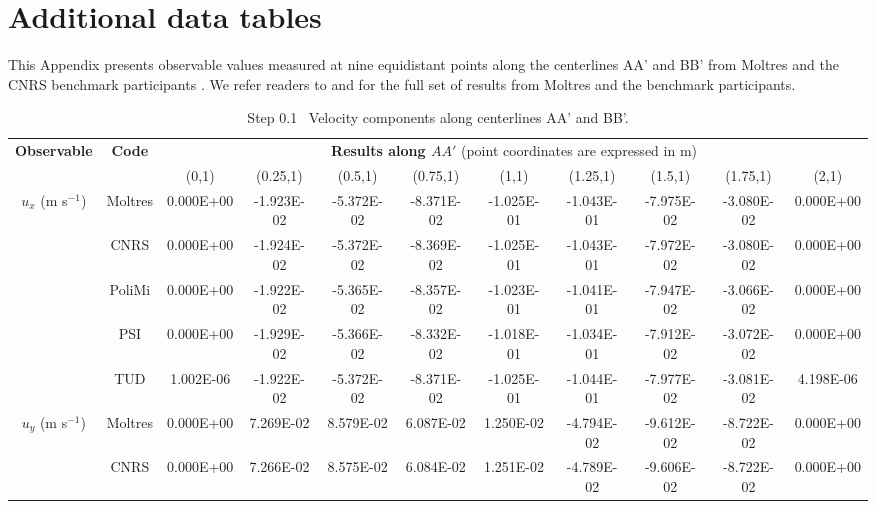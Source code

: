 \appendix
\section{Additional data tables} \label{appendix:tables}

This Appendix presents observable values measured at nine
equidistant points along the centerlines AA' and BB' from Moltres and the
CNRS benchmark participants \cite{tiberga_results_2020}. We refer readers to
\cite{park_results_2021} and \cite{tiberga_results_2019} for the full set of
results from Moltres and the benchmark participants. 

\begin{table}[htbp!]
	\caption{Step 0.1 \textemdash\ Velocity components along centerlines AA' and BB'.}
	\centering
	\footnotesize
	\setlength\tabcolsep{1.5pt}
	\hspace*{-2cm}
	\renewcommand{\arraystretch}{.8}
	\begin{tabular}{c c c c c c c c c c c}
		\toprule
		\multirow{2}{*}{\textbf{Observable}} & \multirow{2}{*}{\textbf{Code}} & \multicolumn{9}{c}{\textbf{Results along $AA'$} (point coordinates are expressed in m)} \\
		& & {(0,1)} & {(0.25,1)} & {(0.5,1)} & {(0.75,1)} & {(1,1)} & {(1.25,1)} & {(1.5,1)} & {(1.75,1)} & {(2,1)} \\
		\midrule
		\multirow{5}{*}{$u_x$ (m s$^{-1}$)} & Moltres & 0.000E+00 & -1.923E-02 & -5.372E-02 & -8.371E-02 & -1.025E-01 & -1.043E-01 & -7.975E-02 & -3.080E-02 & 0.000E+00 \\
		& CNRS & 0.000E+00 & -1.924E-02 & -5.372E-02 & -8.369E-02 & -1.025E-01 & -1.043E-01 & -7.972E-02 & -3.080E-02 & 0.000E+00 \\
        & PoliMi & 0.000E+00 & -1.922E-02 & -5.365E-02 & -8.357E-02 & -1.023E-01 & -1.041E-01 & -7.947E-02 & -3.066E-02 & 0.000E+00 \\
        & PSI & 0.000E+00 & -1.929E-02 & -5.366E-02 & -8.332E-02 & -1.018E-01 & -1.034E-01 & -7.912E-02 & -3.072E-02 & 0.000E+00 \\
        & TUD & 1.002E-06 & -1.922E-02 & -5.372E-02 & -8.371E-02 & -1.025E-01 & -1.044E-01 & -7.977E-02 & -3.081E-02 & 4.198E-06 \\
        \midrule
		\multirow{5}{*}{$u_y$ (m s$^{-1}$)} & Moltres & 0.000E+00 & 7.269E-02 & 8.579E-02 & 6.087E-02 & 1.250E-02 & -4.794E-02 & -9.612E-02 & -8.722E-02 & 0.000E+00\\
		& CNRS & 0.000E+00 & 7.266E-02 & 8.575E-02 & 6.084E-02 & 1.251E-02 & -4.789E-02 & -9.606E-02 & -8.722E-02 & 0.000E+00 \\

\end{tabular}
\end{table}
